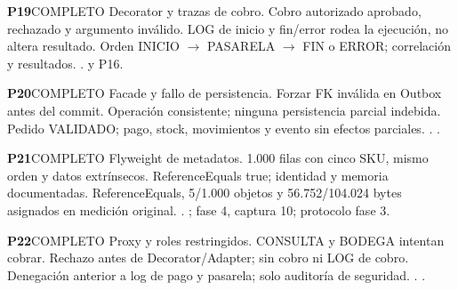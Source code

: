 \par\medskip\noindent\begin{minipage}{\linewidth}
\noindent\textbf{\large P19}\quad\textsf{COMPLETO}
 Decorator y trazas de cobro.
 Cobro autorizado aprobado, rechazado y argumento inválido.
 LOG de inicio y fin/error rodea la ejecución, no altera resultado.
 Orden INICIO $\to$ PASARELA $\to$ FIN o ERROR; correlación y resultados.
 .  y P16.
\end{minipage}\par
\par\medskip\noindent\begin{minipage}{\linewidth}
\noindent\textbf{\large P20}\quad\textsf{COMPLETO}
 Facade y fallo de persistencia.
 Forzar FK inválida en Outbox antes del commit.
 Operación consistente; ninguna persistencia parcial indebida.
 Pedido VALIDADO; pago, stock, movimientos y evento sin efectos parciales.
 . .
\end{minipage}\par
\par\medskip\noindent\begin{minipage}{\linewidth}
\noindent\textbf{\large P21}\quad\textsf{COMPLETO}
 Flyweight de metadatos.
 1.000 filas con cinco SKU, mismo orden y datos extrínsecos.
 ReferenceEquals true; identidad y memoria documentadas.
 ReferenceEquals, 5/1.000 objetos y 56.752/104.024 bytes asignados en medición original.
 . ; fase 4, captura 10; protocolo fase 3.
\end{minipage}\par
\par\medskip\noindent\begin{minipage}{\linewidth}
\noindent\textbf{\large P22}\quad\textsf{COMPLETO}
 Proxy y roles restringidos.
 CONSULTA y BODEGA intentan cobrar.
 Rechazo antes de Decorator/Adapter; sin cobro ni LOG de cobro.
 Denegación anterior a log de pago y pasarela; solo auditoría de seguridad.
 . .
\end{minipage}\par
